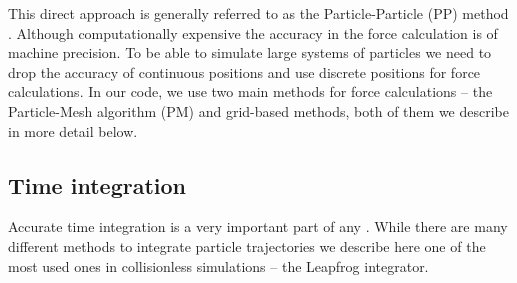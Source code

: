 This direct approach is generally referred to as the Particle-Particle (PP) method \parencite{Hockney:1988:CSU:62815}. Although computationally expensive the accuracy in the force calculation is of machine precision. To be able to simulate large systems of particles we need to drop the accuracy of continuous positions and use discrete positions for force calculations. In our code, we use two main methods for force calculations -- the Particle-Mesh algorithm (PM) and grid-based methods, both of them we describe in more detail below.
\subsection{Time integration}
Accurate time integration is a very important part of any \nbodysim. While there are many different methods to integrate particle trajectories \parencite[see e.g.][]{Hockney:1988:CSU:62815} we describe here one of the most used ones in collisionless simulations -- the Leapfrog integrator.

